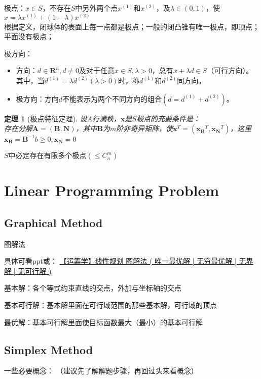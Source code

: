 \documentclass{book}
\newtheorem{theorem}{定理}[chapter]
\begin{document}
极点：$x\in S$，不存在$S$中另外两个点$x^{(1)}$和$x^{(2)}$，及$\lambda\in(0,1)$，使$x=\lambda x^{(1)}+(1-\lambda)x^{(2)}$\\
根据定义，闭球体的表面上每一点都是极点；一般的闭凸锥有唯一极点，即顶点；平面没有极点；

极方向：
\begin{itemize}
    \item 方向：$d\in \mathbf{R}^n, d\ne 0$及对于任意$x\in S,\lambda>0$，总有$x+\lambda d\in S$（可行方向）。其中，当$d^{(1)}=\lambda d^{(2)}(\lambda>0)$时，称$d^{(1)}$和$d^{(2)}$同方向。
    \item 极方向：方向$d$不能表示为两个不同方向的组合$(d=d^{(1)}+d^{(2)})$。
\end{itemize}

\begin{theorem}[极点特征定理]
    设$A$行满秩，$\boldsymbol{x}$是$S$极点的充要条件是：\\
    存在分解$\boldsymbol{A}=(\boldsymbol{B},\boldsymbol{N})$，其中$\boldsymbol{B}$为$m$阶非奇异矩阵，使$\boldsymbol{x}^T=(\boldsymbol{x_B}^T,\boldsymbol{x_N}^T)$，这里$\boldsymbol{x_B}=\boldsymbol{B}^{-1}b\ge0,\boldsymbol{x_N}=0$
\end{theorem}

$S$中必定存在有限多个极点$(\le C_n^m)$

\chapter{Linear Programming Problem}

\section{Graphical Method}
图解法

具体可看ppt或：
\href{https://blog.csdn.net/shulianghan/article/details/102671536}{【运筹学】线性规划 图解法 ( 唯一最优解 | 无穷最优解 | 无界解 | 无可行解 )}

基本解：各个等式约束直线的交点，外加与坐标轴的交点

基本可行解：基本解里面在可行域范围的那些基本解，可行域的顶点

最优解：基本可行解里面使目标函数最大（最小）的基本可行解


\section{Simplex Method}

一些必要概念：
（建议先了解解题步骤，再回过头来看概念）
\end{document}
